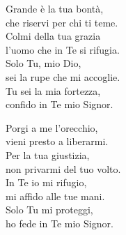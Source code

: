 
\strofa Grande è la tua bontà,\\
che riservi per chi ti teme.\\
Colmi della tua grazia\\
l'uomo che in Te si rifugia.\\
Solo Tu, mio Dio,\\
sei la rupe che mi accoglie.\\
Tu sei la mia fortezza,\\
confido in Te mio Signor. 

\spazio


\spazio

\strofa Porgi a me l'orecchio,\\
vieni presto a liberarmi.\\
Per la tua giustizia,\\
non privarmi del tuo volto.\\
In Te io mi rifugio,\\
mi affido alle tue mani.\\
Solo Tu mi proteggi,\\
ho fede in Te mio Signor.

\spazio

